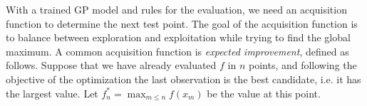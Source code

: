 

With a trained GP model and rules for the evaluation, we need an acquisition function to determine the next test point. The goal of the acquisition function is to balance between exploration and exploitation while trying to find the global maximum. A common acquisition function is \textit{expected improvement}, defined as follows. Suppose that we have already evaluated $f$ in $n$ points, and following the objective of the optimization the last observation is the best candidate, i.e. it has the largest value. Let $f_n^* = \max_{m\leq n}f(x_m)$ be the value at this point. 

